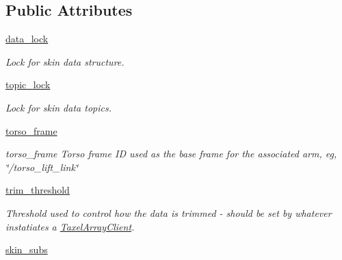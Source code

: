 \subsection*{\-Public \-Attributes}
\begin{DoxyCompactItemize}
\item 
\hyperlink{classhrl__haptic__mpc_1_1skin__client_1_1_taxel_array_client_af9438255764df1147ee97975ddd0df17}{data\-\_\-lock}
\begin{DoxyCompactList}\small\item\em \-Lock for skin data structure. \end{DoxyCompactList}\item 
\hyperlink{classhrl__haptic__mpc_1_1skin__client_1_1_taxel_array_client_a2ddc2c6a62f6055b84877ee3e1b6b492}{topic\-\_\-lock}
\begin{DoxyCompactList}\small\item\em \-Lock for skin data topics. \end{DoxyCompactList}\item 
\hypertarget{classhrl__haptic__mpc_1_1skin__client_1_1_taxel_array_client_aa57dc9d6b63efc1559831c9bf9ed4b62}{\hyperlink{classhrl__haptic__mpc_1_1skin__client_1_1_taxel_array_client_aa57dc9d6b63efc1559831c9bf9ed4b62}{torso\-\_\-frame}}\label{classhrl__haptic__mpc_1_1skin__client_1_1_taxel_array_client_aa57dc9d6b63efc1559831c9bf9ed4b62}

\begin{DoxyCompactList}\small\item\em torso\-\_\-frame \-Torso frame \-I\-D used as the base frame for the associated arm, eg, \char`\"{}/torso\-\_\-lift\-\_\-link\char`\"{} \end{DoxyCompactList}\item 
\hyperlink{classhrl__haptic__mpc_1_1skin__client_1_1_taxel_array_client_ab45770c3baa7409a07abadd03d05a41b}{trim\-\_\-threshold}
\begin{DoxyCompactList}\small\item\em \-Threshold used to control how the data is trimmed -\/ should be set by whatever instatiates a \hyperlink{classhrl__haptic__mpc_1_1skin__client_1_1_taxel_array_client}{\-Taxel\-Array\-Client}. \end{DoxyCompactList}\item 
\hypertarget{classhrl__haptic__mpc_1_1skin__client_1_1_taxel_array_client_a62835436406c9d62e967efed9a434698}{\hyperlink{classhrl__haptic__mpc_1_1skin__client_1_1_taxel_array_client_a62835436406c9d62e967efed9a434698}{skin\-\_\-subs}}\label{classhrl__haptic__mpc_1_1skin__client_1_1_taxel_array_client_a62835436406c9d62e967efed9a434698}


\end{DoxyCompactItemize}
